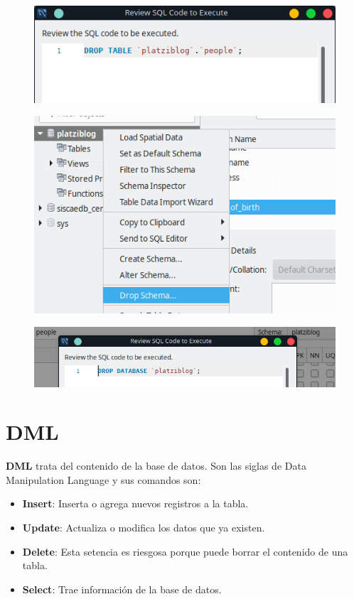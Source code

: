 \documentclass{article}
\begin{document}
\begin{figure}[h!]
  \centering
  \includegraphics[scale=0.75]{./Pictures/059_drop_table_retriew.png}
\end{figure}

\begin{figure}[h!]
  \centering
  \includegraphics[scale=0.75]{./Pictures/060_drop_schema.png}
\end{figure}

\begin{figure}[h!]
  \centering
  \includegraphics[scale=0.75]{./Pictures/061_drop_database.png}
\end{figure}

\newpage

\section{DML}%
\textbf{DML} trata del contenido de la base de datos. Son las siglas de Data
Manipulation Language y sus comandos son:
\begin{itemize}
  \item \textbf{Insert}: Inserta o agrega nuevos registros a la tabla.
  \item \textbf{Update}: Actualiza o modifica los datos que ya existen.
  \item \textbf{Delete}: Esta setencia es riesgosa porque puede borrar el contenido de una tabla.
  \item \textbf{Select}: Trae información de la base de datos.
\end{itemize}
\end{document}

